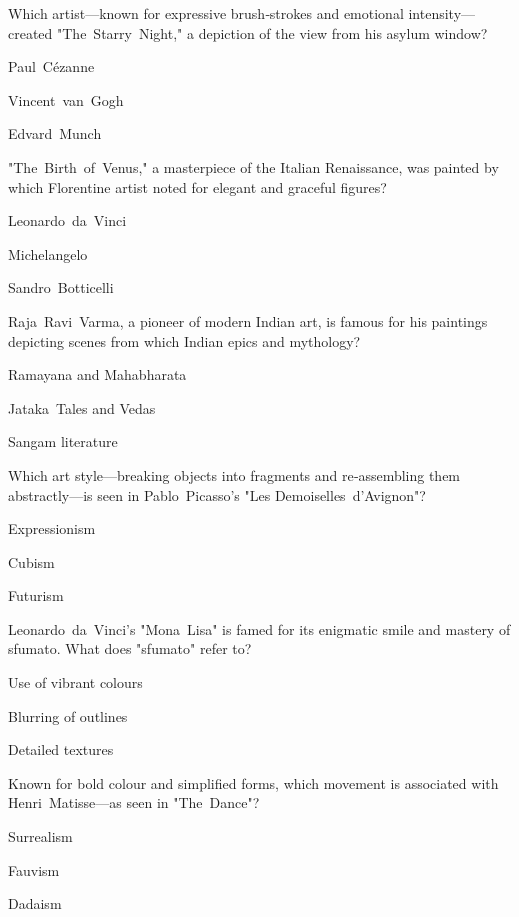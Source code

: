 \begin{enhancedmcq}{Which artist—known for expressive brush‑strokes and emotional intensity—created "The Starry Night," a depiction of the view from his asylum window?}
\item Paul Cézanne
\item Vincent van Gogh
\item Edvard Munch

\end{enhancedmcq}
\begin{enhancedmcq}{"The Birth of Venus," a masterpiece of the Italian Renaissance, was painted by which Florentine artist noted for elegant and graceful figures?}
\item Leonardo da Vinci
\item Michelangelo
\item Sandro Botticelli

\end{enhancedmcq}
\begin{enhancedmcq}{Raja Ravi Varma, a pioneer of modern Indian art, is famous for his paintings depicting scenes from which Indian epics and mythology?}
\item Ramayana and Mahabharata
\item Jataka Tales and Vedas
\item Sangam literature

\end{enhancedmcq}
\begin{enhancedmcq}{Which art style—breaking objects into fragments and re‑assembling them abstractly—is seen in Pablo Picasso's "Les Demoiselles d'Avignon"?}
\item Expressionism
\item Cubism
\item Futurism

\end{enhancedmcq}
\begin{enhancedmcq}{Leonardo da Vinci's "Mona Lisa" is famed for its enigmatic smile and mastery of sfumato. What does "sfumato" refer to?}
\item Use of vibrant colours
\item Blurring of outlines
\item Detailed textures

\end{enhancedmcq}
\begin{enhancedmcq}{Known for bold colour and simplified forms, which movement is associated with Henri Matisse—as seen in "The Dance"?}
\item Surrealism
\item Fauvism
\item Dadaism

\end{enhancedmcq}
